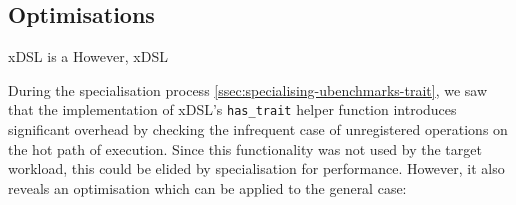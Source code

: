 






\subsection{Optimisations}
\label{sec:specialising-pattern-rewriting-optimisations}

xDSL is a
However, xDSL


During the specialisation process \autoref{ssec:specialising-ubenchmarks-trait}, we saw that the implementation of xDSL's \texttt{has\_trait} helper function introduces significant overhead by checking the infrequent case of unregistered operations on the hot path of execution.
Since this functionality was not used by the target workload, this could be elided by specialisation for performance. However, it also reveals an optimisation which can be applied to the general case:


